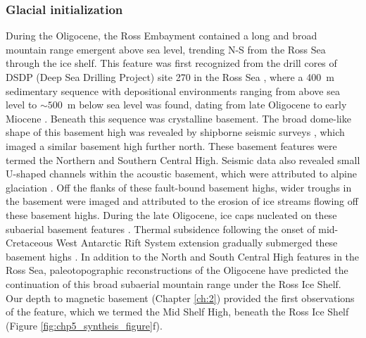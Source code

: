 \subsubsection{Glacial initialization}
During the Oligocene, the Ross Embayment contained a long and broad mountain range emergent above sea level, trending N-S from the Ross Sea through the ice shelf. This feature was first recognized from the drill cores of DSDP (Deep Sea Drilling Project) site 270 in the Ross Sea \citep[Figure \ref{fig:chp5_syntheis_figure}f, ][]{leckielate1983}, where a 400~m sedimentary sequence with depositional environments ranging from above sea level to $\sim500$~m below sea level was found, dating from late Oligocene to early Miocene \citep{kulhanekrevised2019}. Beneath this sequence was crystalline basement. The broad dome-like shape of this basement high was revealed by shipborne seismic surveys \citep{brancolinidescriptive1995}, which imaged a similar basement high further north. These basement features were termed the Northern and Southern Central High. Seismic data also revealed small U-shaped channels within the acoustic basement, which were attributed to alpine glaciation \citep{desantisseismic1995}. Off the flanks of these fault-bound basement highs, wider troughs in the basement were imaged and attributed to the erosion of ice streams flowing off these basement highs. During the late Oligocene, ice caps nucleated on these subaerial basement features \citep{desantisseismic1995, olivettiice2023}. Thermal subsidence following the onset of mid-Cretaceous West Antarctic Rift System extension \citep{karnergravity2005, wilsonwest2009} gradually submerged these basement highs \citep{desantiseastern1999, olivettiice2023}. In addition to the North and South Central High features in the Ross Sea, paleotopographic reconstructions of the Oligocene \citep{paxmanreconstructions2019, wilsonantarctic2012} have predicted the continuation of this broad subaerial mountain range under the Ross Ice Shelf. Our depth to magnetic basement (Chapter \ref{ch:2}) provided the first observations of the feature, which we termed the Mid Shelf High, beneath the Ross Ice Shelf (Figure \ref{fig:chp5_syntheis_figure}f). \\

